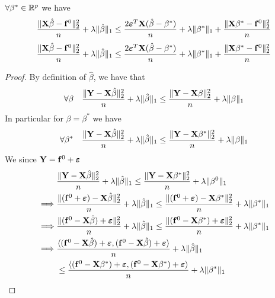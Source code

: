 \begin{lemma}
    $\forall \beta^* \in \mathbb{R}^p$ we have
    \begin{equation}
        \frac{\|\mathbf{X} \hat \beta - \mathbf{f}^0 \|_{2}^{2}}{n} + \lambda\| \hat \beta \|_{1} \leq \frac{2 \boldsymbol{\varepsilon}^T \mathbf{X} (\hat\beta - \beta^*)}{n} + \lambda \| \beta^*\|_{1} + \frac{\|\mathbf{X} \beta^* - \mathbf{f}^0\|_{2}^{2}}{n}
    \end{equation}
    $$    \frac{\|\mathbf{X} \hat \beta - \mathbf{f}^0 \|_{2}^{2}}{n} + \lambda\| \hat \beta \|_{1} \leq  \frac{2 \boldsymbol{\varepsilon}^T \mathbf{X} (\hat\beta - \beta^*)}{n} + \lambda \| \beta^*\|_{1} + \frac{\|\mathbf{X} \beta^* - \mathbf{f}^0\|_{2}^{2}}{n}$$
\end{lemma}
\begin{proof}
    By definition of $\hat \beta$, we have that
    $$
        \forall \beta \quad \frac{\| \mathbf{Y} -\mathbf{X} \hat \beta \|_{2}^{2}}{n} + \lambda \| \hat \beta \|_{1} \leq \frac{\|\mathbf{Y}-\mathbf{X} \beta \|_{2}^{2}}{n}+\lambda \| \beta \|_{1}
    $$
    In particular for $\beta = \beta^*$ we have
    $$
        \forall \beta^* \quad \frac{\| \mathbf{Y} -\mathbf{X} \hat \beta \|_{2}^{2}}{n} + \lambda \| \hat \beta \|_{1} \leq \frac{\|\mathbf{Y}-\mathbf{X} \beta^* \|_{2}^{2}}{n}+\lambda \| \beta \|_{1}
    $$
    We since $\mathbf{Y} = \mathbf{f}^0 + \boldsymbol{\varepsilon}$
    \begin{align*}
                 & \frac{\|\Y  - \X \hat{\beta} \|_{2}^{2}}{n} + \lambda \| \hat{\beta}\|_{1} \leq \frac{\| \Y  - \X \beta^* \|_2^2}{n}+\lambda\|\beta^{0}\|_{1}                                                                      \\
        \implies &
        \frac{\| (\mathbf{f}^0 + \eps) - \X \hat \beta \|_{2}^{2}}{n} + \lambda\| \hat \beta \|_{1} \leq \frac{ \| (\mathbf{f}^0 + \eps)-\X \beta^*\|_{2}^{2}}{n}+\lambda \| \beta^*\|_{1}                                            \\
        \implies &
        \frac{\| (\mathbf{f}^0 - \X \hat \beta ) + \eps \|_{2}^{2}}{n} + \lambda\| \hat \beta \|_{1} \leq \frac{ \| (\mathbf{f}^0 - \X \beta^*) + \eps \|_{2}^{2}}{n}+\lambda \| \beta^*\|_{1}                                        \\
        \implies &
        \frac{\langle (\mathbf{f}^0 - \X \hat \beta ) + \eps, (\mathbf{f}^0 - \X \hat \beta ) + \eps \rangle}{n} + \lambda\| \hat \beta \|_{1}                                                                                        \\
                 & \leq \frac{ \langle (\mathbf{f}^0 - \X \beta^*) + \eps, (\mathbf{f}^0 - \X \beta^*) + \eps \rangle}{n}+\lambda \| \beta^*\|_{1}                                                                                    \\

\end{align*}
\end{proof}
